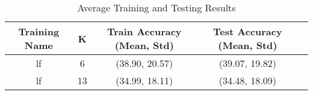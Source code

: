 \begin{table}[h!]
\centering
\begin{tabular}{|c|c|c|c|c|}
\hline
Training Name & K & Train Accuracy (Mean, Std) & Test Accuracy (Mean, Std)\\
\hline
lf & 6 & (38.90, 20.57) & (39.07, 19.82)\\
lf & 13 & (34.99, 18.11) & (34.48, 18.09)\\
\hline
\end{tabular}
\caption{Average Training and Testing Results}
\label{tab:average_results}
\end{table}